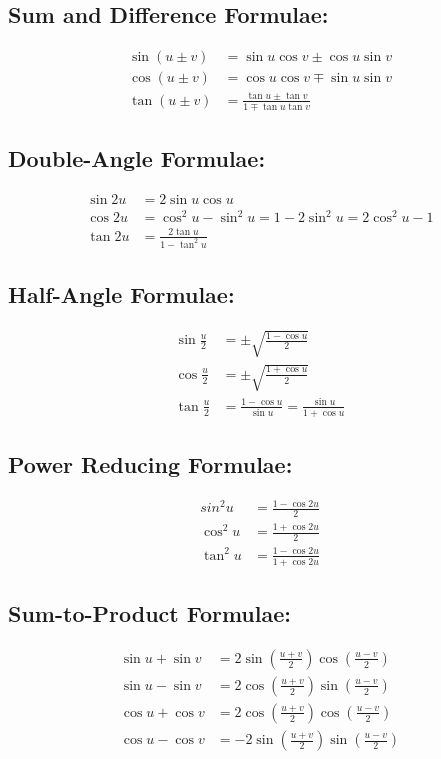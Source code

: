 \documentclass{amsart}
\begin{document}
\begin{multicols}{2}
    \subsection*{ Sum and Difference Formulae:}
    \begin{align*}
    \sin(u\pm v)&=\sin u\cos v\pm\cos u\sin v\\
    \cos(u\pm v)&=\cos u\cos v\mp\sin u\sin v\\
    \tan(u\pm v)&=\frac{\tan u\pm \tan v}{1\mp\tan u\tan v}
    \end{align*}
    \subsection*{Double-Angle Formulae:}
    \begin{align*}
    \sin 2u&=2\sin u\cos u\\\cos 2u&=\cos^2u-\sin^2u=1-2\sin^2u=2\cos^2u-1\\\tan 2u&=\frac{2\tan u}{1-\tan^2u}
    \end{align*}
    \subsection*{Half-Angle Formulae:}
    \begin{align*}
    \sin\frac{u}{2}&=\pm\sqrt{\frac{1-\cos u}{2}}\\
    \cos\frac{u}{2}&=\pm\sqrt{\frac{1+\cos u}{2}}\\
    \tan\frac{u}{2}&=\frac{1-\cos u}{\sin u}=\frac{\sin u}{1+\cos u}
    \end{align*}
    \subsection*{Power Reducing Formulae:}
    \begin{align*}
    sin^2u&=\frac{1-\cos 2u}{2}\\\cos^2u&=\frac{1+\cos 2u}{2}\\\tan^2u&=\frac{1-\cos 2u}{1+\cos 2u}
    \end{align*}
    \subsection*{Sum-to-Product Formulae:}
    \begin{align*}
    \sin u+\sin v&=2\sin\left(\frac{u+v}{2}\right)\cos\left(\frac{u-v}{2}\right)\\
    \sin u-\sin v&=2\cos\left(\frac{u+v}{2}\right)\sin\left(\frac{u-v}{2}\right)\\
    \cos u+\cos v&=2\cos\left(\frac{u+v}{2}\right)\cos\left(\frac{u-v}{2}\right)\\
    \cos u-\cos v&=-2\sin\left(\frac{u+v}{2}\right)\sin\left(\frac{u-v}{2}\right)
    \end{align*}

\end{multicols}
\end{document}
